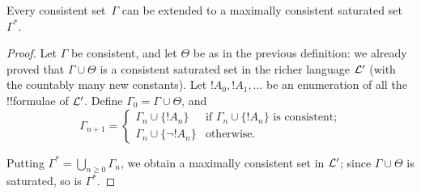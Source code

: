 \documentclass[../../include/open-logic-section]{subfiles}
\begin{document}

\begin{lem}
Every consistent set~$\Gamma$ can be extended to a maximally
consistent saturated set~$\Gamma^*$.
\end{lem}

\begin{proof}
Let $\Gamma$ be consistent, and let $\Theta$ be as in the previous
definition: we already proved that $\Gamma \cup \Theta$ is a
consistent saturated set in the richer language $\mathcal L'$ (with the
countably many new constants). Let $!A_0, !A_1, \dots$ be an
enumeration of all the !!{formula}e of $\mathcal L'$. Define $\Gamma_0 =
\Gamma \cup \Theta$, and
\[
\Gamma_{n+1} =
\begin{cases}
\Gamma_n \cup \{ !A_n \} & \textrm{if $\Gamma_n \cup \{!A_n\}$ is
  consistent;} \\ 
\Gamma_n \cup \{ \lnot !A_n \} & \textrm{otherwise.}
\end{cases}
\]

Putting $\Gamma^* = \bigcup_{n \geq 0} \Gamma_n$, we obtain a maximally consistent 
set in $\mathcal L'$; since $\Gamma \cup \Theta$ is saturated, so is $\Gamma^*$. 

\end{proof}
\end{document}
